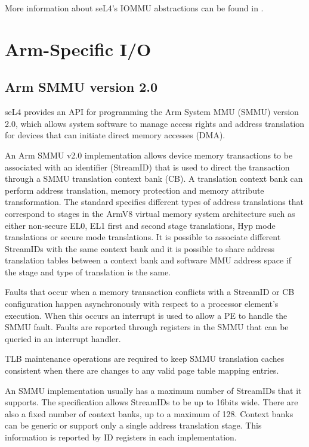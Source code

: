 More information about seL4's IOMMU abstractions can be found in \cite{Palande:M}.
\fi

\section{Arm-Specific I/O}

\subsection{Arm SMMU version 2.0}
\label{sec:smmuv2}


seL4 provides an API for programming the Arm System MMU (SMMU) version 2.0,
which allows system software to manage access rights and address translation for
devices that can initiate direct memory accesses (DMA).

An Arm SMMU v2.0 implementation allows device memory transactions to be associated
with an identifier (StreamID) that is used to direct the transaction through a
SMMU translation context bank (CB). A translation context bank can perform
address translation, memory protection and memory attribute transformation.
The standard specifies different types of address translations that correspond
to stages in the ArmV8 virtual memory system architecture such as either
non-secure  EL0, EL1 first and second stage translations, Hyp mode translations
or secure mode translations. It is possible to associate different StreamIDs
with the same context bank and it is possible to share address translation
tables between a context bank and software MMU address space if the stage and type
of translation is the same.

Faults that occur when a memory transaction conflicts with a StreamID or CB
configuration happen asynchronously with respect to a processor element's
execution. When this occurs an interrupt is used to allow a PE to handle the
SMMU fault. Faults are reported through registers in the SMMU that can be
queried in an interrupt handler.

TLB maintenance operations are required to keep SMMU translation caches
consistent when there are changes to any valid page table mapping entries.

An SMMU implementation usually has a maximum number of StreamIDs that it supports.
The specification allows StreamIDs to be up to 16bits wide. There are also a
fixed number of context banks, up to a maximum of 128. Context banks can
be generic or support only a single address translation stage. This information
is reported by ID registers in each implementation.

